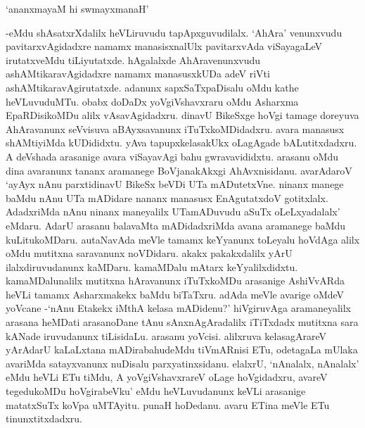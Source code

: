 \begin{shloka}
`ananxmayaM hi swmayxmanaH'
\end{shloka}

-eMdu shAsatxrXdalilx heVLiruvudu tapApxguvudilalx. `AhAra' venunxvudu pavitarxvAgidadxre namamx manasisxnalUlx pavitarxvAda viSayagaLeV irutatxveMdu tiLiyutatxde. hAgalalxde AhAravenunxvudu ashAMtikaravAgidadxre namamx manasusxkUDa adeV riVti ashAMtikaravAgirutatxde. adanunx sapxSaTxpaDisalu oMdu kathe heVLuvuduMTu. obabx doDaDx yoVgiVshavxraru oMdu Asharxma EpaRDisikoMDu alilx vAsavAgidadxru. dinavU BikeSxge hoVgi tamage doreyuva AhAravanunx seVvisuva aBAyxsavanunx iTuTxkoMDidadxru. avara manasusx shAMtiyiMda kUDididxtu. yAva tapupxkelasakUkx oLagAgade bALutitxdadxru. A deVshada arasanige avara viSayavAgi bahu gwravavididxtu. arasanu oMdu dina avaranunx tananx aramanege BoVjanakAkxgi AhAvxnisidanu. avarAdaroV `ayAyx nAnu parxtidinavU BikeSx beVDi UTa mADutetxVne. ninanx manege baMdu nAnu UTa mADidare nananx manasusx EnAgutatxdoV gotitxlalx. AdadxriMda nAnu ninanx maneyalilx UTamADuvudu aSuTx oLeLxyadalalx' eMdaru. AdarU arasanu balavaMta mADidadxriMda avana aramanege baMdu kuLitukoMDaru. autaNavAda meVle tamamx keYyanunx toLeyalu hoVdAga alilx oMdu mutitxna saravanunx noVDidaru. akakx pakakxdalilx yArU ilalxdiruvudanunx kaMDaru. kamaMDalu mAtarx keYyalilxdidxtu. kamaMDalunalilx mutitxna hAravanunx iTuTxkoMDu arasanige AshiVvARda heVLi tamamx Asharxmakekx baMdu biTaTxru. adAda meVle avarige oMdeV yoVcane -`nAnu Etakekx iMthA kelasa mADidenu?' hiVgiruvAga aramaneyalilx arasana heMDati arasanoDane tAnu sAnxnAgAradalilx iTiTxdadx mutitxna sara kANade iruvudanunx tiLisidaLu. arasanu yoVcisi. alilxruva kelasagArareV yArAdarU kaLaLxtana mADirabahudeMdu tiVmARnisi ETu, odetagaLa mUlaka avariMda satayxvanunx nuDisalu parxyatinxsidanu. elalxrU, `nAnalalx, nAnalalx' eMdu heVLi ETu tiMdu, A yoVgiVshavxrareV oLage hoVgidadxru, avareV tegedukoMDu hoVgirabeVku' eMdu heVLuvudanunx keVLi arasanige matatxSuTx koVpa uMTAyitu. punaH hoDedanu. avaru ETina meVle ETu tinunxtitxdadxru.

